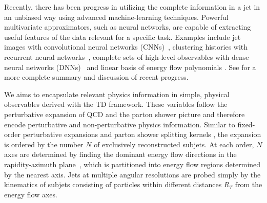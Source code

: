 \documentclass[notoc,preprintnumbers]{JHEP3}
\begin{document}
Recently, there has been progress in utilizing the complete information in a jet in an unbiased way using advanced machine-learning techniques. Powerful multivariate approximators, such as neural networks, are capable of extracting useful features of the data relevant for a specific task. Examples include jet images with convolutional neural networks (CNNs)~\cite{Cogan:2014oua,deOliveira:2015xxd,Komiske:2016rsd,Kasieczka:2017nvn}, clustering histories with recurrent neural networks~\cite{Louppe:2017ipp}, complete sets of high-level observables with dense neural networks (DNNs)~\cite{Datta:2017rhs,Datta:2017lxt,Aguilar-Saavedra:2017rzt} and linear basis of energy flow polynomials \cite{Komiske:2017aww}. See \cite{Larkoski:2017jix} for a more complete summary and discussion of recent progress.

We aims to encapsulate relevant physics information in simple, physical observables derived with the TD framework. These variables follow the perturbative expansion of QCD and the parton shower picture and therefore encode perturbative and non-perturbative physics information. Similar to fixed-order perturbative expansions and parton shower splitting kernels \cite{Nagy:2017ggp}, the expansion is ordered by the number $N$ of exclusively reconstructed subjets. At each order, $N$ axes are determined by finding the dominant energy flow directions in the rapidity-azimuth plane~\cite{Stewart:2010tn,Chien:2013kca,Stewart:2015waa,Thaler:2015xaa}, which is partitioned into energy flow regions determined by the nearest axis. Jets at multiple angular resolutions are probed simply by the kinematics of subjets consisting of particles within different distances $R_T$ from the energy flow axes.
\end{document}
